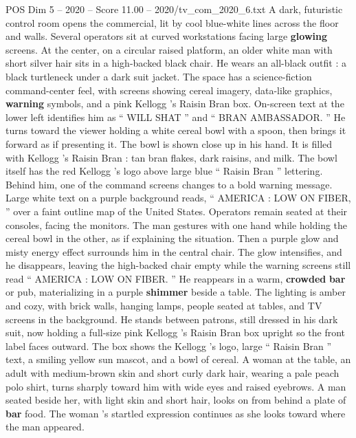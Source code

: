 \begin{textsample}{POS Dim 5 – 2020 – Score 11.00 – 2020/tv\_com\_2020\_6.txt}  \label{ex:f5_pos_063}
A dark, futuristic control room opens the commercial, lit by cool blue-white lines across the floor and walls.
Several operators sit at curved workstations facing large \textbf{glowing} screens.
At the center, on a circular raised platform, an older white man with short silver hair sits in a high-backed black chair.
He wears an all-black outfit : a black turtleneck under a dark suit jacket.
The space has a science-fiction command-center feel, with screens showing cereal imagery, data-like graphics, \textbf{warning} symbols, and a pink Kellogg ’s Raisin Bran box.
On-screen text at the lower left identifies him as “ WILL SHAT ” and “ BRAN AMBASSADOR. ” He turns toward the viewer holding a white cereal bowl with a spoon, then brings it forward as if presenting it.
The bowl is shown close up in his hand.
It is filled with Kellogg ’s Raisin Bran : tan bran flakes, dark raisins, and milk.
The bowl itself has the red Kellogg ’s logo above large blue “ Raisin Bran ” lettering.
Behind him, one of the command screens changes to a bold warning message.
Large white text on a purple background reads, “ AMERICA : LOW ON FIBER, ” over a faint outline map of the United States.
Operators remain seated at their consoles, facing the monitors.
The man gestures with one hand while holding the cereal bowl in the other, as if explaining the situation.
Then a purple glow and misty energy effect surrounds him in the central chair.
The glow intensifies, and he disappears, leaving the high-backed chair empty while the warning screens still read “ AMERICA : LOW ON FIBER. ” He reappears in a warm, \textbf{crowded} \textbf{bar} or pub, materializing in a purple \textbf{shimmer} beside a table.
The lighting is amber and cozy, with brick walls, hanging lamps, people seated at tables, and TV screens in the background.
He stands between patrons, still dressed in his dark suit, now holding a full-size pink Kellogg ’s Raisin Bran box upright so the front label faces outward.
The box shows the Kellogg ’s logo, large “ Raisin Bran ” text, a smiling yellow sun mascot, and a bowl of cereal.
A woman at the table, an adult with medium-brown skin and short curly dark hair, wearing a pale peach polo shirt, turns sharply toward him with wide eyes and raised eyebrows.
A man seated beside her, with light skin and short hair, looks on from behind a plate of \textbf{bar} food.
The woman ’s startled expression continues as she looks toward where the man appeared.

\end{textsample}
